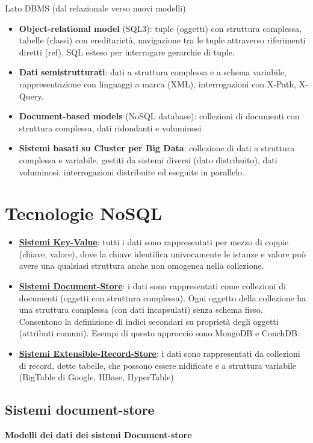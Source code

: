 \documentclass[a4paper, 10pt]{article}
\theoremstyle{definition}
\begin{document}
		Lato DBMS (dal relazionale verso nuovi modelli)
	\begin{itemize}
		\item \textbf{Object-relational model} (SQL3): tuple (oggetti) con struttura complessa,
		tabelle (classi) con ereditarietà, navigazione tra le tuple attraverso
		riferimenti diretti (ref), SQL esteso per interrogare gerarchie di tuple.
		\item \textbf{Dati semistrutturati}: dati a struttura complessa e a schema variabile,
		rappresentazione con linguaggi a marca (XML), interrogazioni con X-Path,
		X-Query.
		\item \textbf{Document-based models} (NoSQL database): collezioni di documenti con
		struttura complessa, dati ridondanti e voluminosi
		\item \textbf{Sistemi basati su Cluster per Big Data}: collezione di dati a struttura
		complessa e variabile, gestiti da sistemi diversi (dato distribuito), dati
		voluminosi, interrogazioni distribuite ed eseguite in parallelo.
	\end{itemize}
	
\section{Tecnologie NoSQL}
	\begin{itemize}
		\item \underline{\textbf{Sistemi Key-Value}}: tutti i dati sono rappresentati per mezzo di
		coppie (chiave, valore), dove la chiave identifica univocamente le
		istanze e valore può avere una qualsiasi struttura anche non omogenea
		nella collezione.
		\item \underline{\textbf{Sistemi Document-Store}}: i dati sono rappresentati come collezioni
		di documenti (oggetti con struttura complessa). Ogni oggetto della
		collezione ha una struttura complessa (con dati incapsulati) senza
		schema fisso. Consentono la definizione di indici secondari su proprietà
		degli oggetti (attributi comuni). Esempi di questo approccio sono
		MongoDB e CouchDB.
		\item \underline{\textbf{Sistemi Extensible-Record-Store}}: i dati sono rappresentati da
		collezioni di record, dette tabelle, che possono essere nidificate e a
		struttura variabile (BigTable di Google, HBase, HyperTable)
	\end{itemize}
	
	\subsection{Sistemi document-store}
		\textbf{Modelli dei dati dei sistemi Document-store}
		
\end{document}
